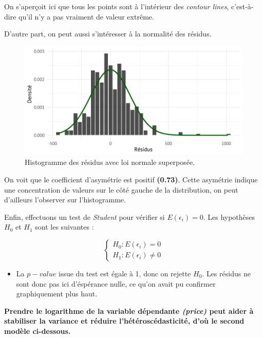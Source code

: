 \documentclass[
  12pt,
]{report}
\providecommand{\tightlist}{%
  \setlength{\itemsep}{0pt}\setlength{\parskip}{0pt}}\usepackage{longtable,booktabs,array}
\begin{document}
On s'aperçoit ici que tous les points sont à l'intérieur des
\emph{contour lines}, c'est-à-dire qu'il n'y a pas vraiment de valeur
extrême.

D'autre part, on peut aussi s'intéresser à la normalité des résidus.

\begin{figure}[H]

{\centering \includegraphics{report_files/figure-pdf/normality_level-1.pdf}

}

\caption{Histogramme des résidus avec loi normale superposée.}

\end{figure}%

On voit que le coefficient d'asymétrie est positif \textbf{(0.73)}.
Cette asymétrie indique une concentration de valeurs sur le côté gauche
de la distribution, on peut d'ailleurs l'observer sur l'histogramme.

Enfin, effectuons un test de \emph{Student} pour vérifier si
\(E(\epsilon_i) = 0\). Les hypothèses \(H_0\) et \(H_1\) sont les
suivantes :

\[
\begin{cases}
H_0 : E(\epsilon_i) = 0\\
H_1 : E(\epsilon_i) \neq 0
\end{cases}
\]

\vspace{1em}

\begin{itemize}
\tightlist
\item
  La \(p-value\) issue du test est égale à 1, donc on rejette \(H_0\).
  Les résidus ne sont donc pas ici d'éspérance nulle, ce qu'on avait pu
  confirmer graphiquement plus haut.
\end{itemize}

\textbf{Prendre le logarithme de la variable dépendante \emph{(price)}
peut aider à stabiliser la variance et réduire l'hétéroscédasticité,
d'où le second modèle ci-dessous.}
\end{document}
